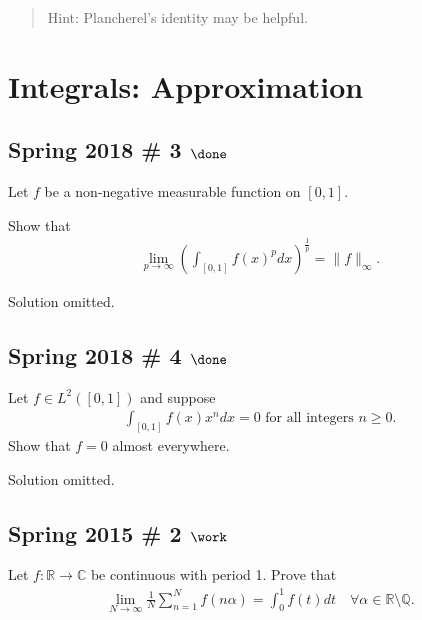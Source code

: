 \begin{quote}
Hint: Plancherel's identity may be helpful.
\end{quote}

\hypertarget{integrals-approximation}{%
\section{Integrals: Approximation}\label{integrals-approximation}}

\hypertarget{spring-2018-3-done}{%
\subsection{\texorpdfstring{Spring 2018 \# 3
\(\done\)}{Spring 2018 \# 3 \textbackslash done}}\label{spring-2018-3-done}}

Let \(f\) be a non-negative measurable function on \([0, 1]\).

Show that
\begin{align*}
\lim _{p \rightarrow \infty}\left(\int_{[0,1]} f(x)^{p} d x\right)^{\frac{1}{p}}=\|f\|_{\infty}.
\end{align*}

Solution omitted.

\hypertarget{spring-2018-4-done}{%
\subsection{\texorpdfstring{Spring 2018 \# 4
\(\done\)}{Spring 2018 \# 4 \textbackslash done}}\label{spring-2018-4-done}}

Let \(f\in L^2([0, 1])\) and suppose
\begin{align*}
\int _{[0,1]} f(x) x^{n} d x=0 \text { for all integers } n \geq 0.
\end{align*}
Show that \(f = 0\) almost everywhere.

Solution omitted.

\hypertarget{spring-2015-2-work}{%
\subsection{\texorpdfstring{Spring 2015 \# 2
\(\work\)}{Spring 2015 \# 2 \textbackslash work}}\label{spring-2015-2-work}}

Let \(f: {\mathbb{R}}\to {\mathbb{C}}\) be continuous with period 1.
Prove that
\begin{align*}
\lim _{N \rightarrow \infty} \frac{1}{N} \sum_{n=1}^{N} f(n \alpha)=\int_{0}^{1} f(t) d t \quad \forall \alpha \in {\mathbb{R}}\setminus{\mathbb{Q}}.
\end{align*}

